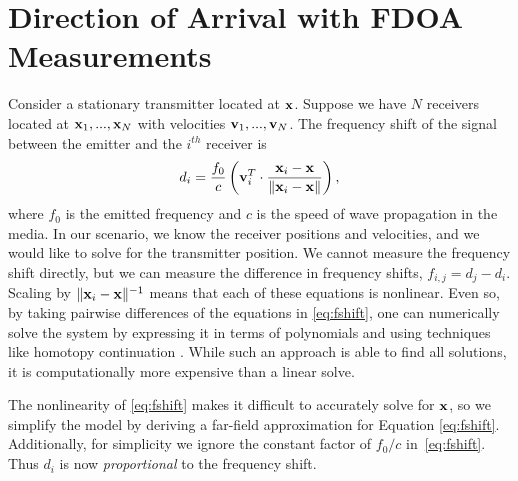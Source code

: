 \section{Direction of Arrival with FDOA Measurements}
\label{s:FDOA}

Consider a stationary transmitter located at $\mathbf{x}$. Suppose we have $N$ receivers located at $\mathbf{x}_1, ...,\mathbf{x}_N$ with velocities $\mathbf{v}_1, ...,\mathbf{v}_N$. The frequency shift of the signal between the emitter and the $i^{th}$ receiver is
\begin{align}
  \label{eq:fshift}
  d_i =  \frac{f_0}{c}\left(\mathbf{v}_i^T\cdot\frac{\mathbf{x}_i-\mathbf{x}}{\|\mathbf{x}_i-\mathbf{x}\|}\right),
\end{align}
where $f_0$ is the emitted frequency and $c$ is the speed of wave propagation in the media. In our scenario, we know the receiver positions and velocities, and we would like to solve for the transmitter position. We cannot measure the frequency shift directly, but we can measure the difference in frequency shifts,
$f_{i,j} = d_j-d_i$. Scaling by $\|\mathbf{x}_i-\mathbf{x}\|^{-1}$ means that each of these equations is nonlinear. Even so, by taking pairwise differences of the equations in \eqref{eq:fshift}, one can numerically solve the system by expressing it in terms of polynomials and using techniques like homotopy continuation \cite{Cameron}. While such an approach is able to find all solutions, it is computationally more expensive than a linear solve.

The nonlinearity of \eqref{eq:fshift} makes it difficult to accurately solve for $\mathbf{x}$, so we simplify the model by deriving a far-field approximation for Equation \ref{eq:fshift}. Additionally, for simplicity we ignore the constant factor of $f_0/c$ in~\eqref{eq:fshift}. Thus $d_i$ is now \textit{proportional} to the frequency shift.

